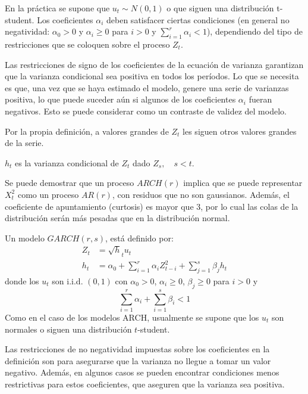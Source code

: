 En la pr\'{a}ctica se supone que $u_{t}\sim N(0,1)$ o que siguen una distribuci\'{o}n t-student. Los coeficientes $\alpha_{i}$ deben satisfacer ciertas condiciones (en general no negatividad: $\alpha_{0}>0$ y $\alpha_{i}\geq 0$ para $i>0$ y $\sum_{i=1}^r \alpha_{i} <1$), dependiendo del tipo de restricciones que se coloquen sobre el proceso $Z_{t}$.\newline

Las restricciones de signo de los coeficientes de la ecuaci\'{o}n de varianza garantizan que la varianza condicional sea positiva en todos los per\'{i}odos. Lo que se necesita es que, una vez que se haya estimado el modelo, genere una serie de varianzas positiva, lo que puede suceder a\'{u}n si algunos de los coeficientes $\alpha_{i}$ fueran negativos. Esto se puede considerar como un contraste de validez del modelo.\newline

Por la propia definici\'{o}n, a valores grandes de $Z_{t}$ les siguen otros valores grandes de la serie.\newline

$h_{t}$ es la varianza condicional de $Z_{t}$ dado $Z_{s},\quad s<t$.

\begin{observacion}
Se puede demostrar que un proceso $ARCH(r)$ implica que se puede representar $X_{t}^{2}$ como un proceso $AR(r)$, con residuos que no son gaussianos. Adem\'{a}s, el coeficiente de apuntamiento (curtosis) es mayor que 3, por lo cual las colas de la distribuci\'{o}n ser\'{a}n m\'{a}s pesadas que en la distribuci\'{o}n normal.
\end{observacion}

\begin{definicion}
Un modelo $GARCH(r,s)$, est\'{a} definido por:
\begin{align*}
 Z_{t}&=\sqrt h_{t} u_{t} \\ 
 h_{t}&=\alpha_{0}+\sum_{i=1}^r {\alpha_{i}Z_{t-i}^{2}} +\sum_{j=1}^s {\beta_{j}h_{t}} 
\end{align*}
donde los $u_{t}$ son i.i.d. $(0,1)$ con $\alpha_{0}>0$, $\alpha_{i}\geq 0$, $\beta_{j}\geq 0$ para $i>0$ y
\[
\sum_{i=1}^r \alpha_{i} +\sum_{i=1}^s \beta_{i} <1
\]
Como en el caso de los modelos ARCH, usualmente se supone que los $u_{t}$ son normales o siguen una distribuci\'{o}n $t$-student.
\end{definicion}

Las restricciones de no negatividad impuestas sobre los coeficientes en la definici\'{o}n son para asegurarse que la varianza no llegue a tomar un valor negativo. Adem\'{a}s, en algunos casos se pueden encontrar condiciones menos restrictivas para estos coeficientes, que aseguren que la varianza sea positiva. 

